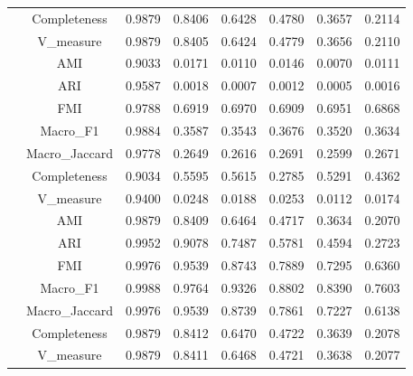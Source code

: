 \begin{table}[ht!]
\begin{tabular*}{\linewidth}{@{} lc c c c c c c @{}}
 & Completeness  & 0.9879 & 0.8406 & 0.6428 & 0.4780 & 0.3657 & 0.2114 \\

 & V_measure  & 0.9879 & 0.8405 & 0.6424 & 0.4779 & 0.3656 & 0.2110 \\
\addlinespace
\multirow{7}{*}{IZGC}
 & AMI  & 0.9033 & 0.0171 & 0.0110 & 0.0146 & 0.0070 & 0.0111 \\

 & ARI  & 0.9587 & 0.0018 & 0.0007 & 0.0012 & 0.0005 & 0.0016 \\

 & FMI  & 0.9788 & 0.6919 & 0.6970 & 0.6909 & 0.6951 & 0.6868 \\

 & Macro_F1  & 0.9884 & 0.3587 & 0.3543 & 0.3676 & 0.3520 & 0.3634 \\

 & Macro_Jaccard  & 0.9778 & 0.2649 & 0.2616 & 0.2691 & 0.2599 & 0.2671 \\

 & Completeness  & 0.9034 & 0.5595 & 0.5615 & 0.2785 & 0.5291 & 0.4362 \\

 & V_measure  & 0.9400 & 0.0248 & 0.0188 & 0.0253 & 0.0112 & 0.0174 \\
\addlinespace
\multirow{7}{*}{K-means++}
 & AMI  & 0.9879 & 0.8409 & 0.6464 & 0.4717 & 0.3634 & 0.2070 \\

 & ARI  & 0.9952 & 0.9078 & 0.7487 & 0.5781 & 0.4594 & 0.2723 \\

 & FMI  & 0.9976 & 0.9539 & 0.8743 & 0.7889 & 0.7295 & 0.6360 \\

 & Macro_F1  & 0.9988 & 0.9764 & 0.9326 & 0.8802 & 0.8390 & 0.7603 \\

 & Macro_Jaccard  & 0.9976 & 0.9539 & 0.8739 & 0.7861 & 0.7227 & 0.6138 \\

 & Completeness  & 0.9879 & 0.8412 & 0.6470 & 0.4722 & 0.3639 & 0.2078 \\

 & V_measure  & 0.9879 & 0.8411 & 0.6468 & 0.4721 & 0.3638 & 0.2077 \\
\bottomrule
\end{tabular*}
\end{table}
